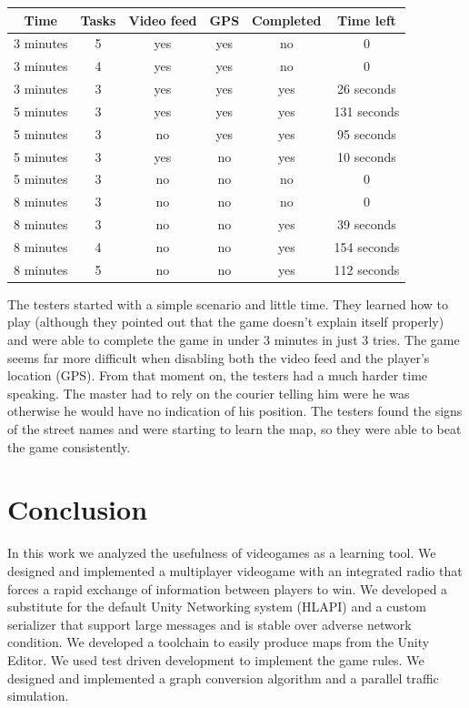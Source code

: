 \documentclass[12pt]{article}
\begin{document}
\begin{center}
\begin{tabular}{ |c|c|c|c||c|c| }
\hline
	Time & Tasks & Video feed & GPS & Completed & Time left \\
\hline
	3 minutes & 5 & yes & yes & no & 0 \\
	3 minutes & 4 & yes & yes & no & 0 \\
	3 minutes & 3 & yes & yes & yes & 26 seconds \\
	5 minutes & 3 & yes & yes & yes & 131 seconds \\
	5 minutes & 3 & no & yes & yes & 95 seconds \\
	5 minutes & 3 & yes & no & yes & 10 seconds \\
	5 minutes & 3 & no & no & no & 0 \\
	8 minutes & 3 & no & no & no & 0 \\
	8 minutes & 3 & no & no & yes & 39 seconds \\
	8 minutes & 4 & no & no & yes & 154 seconds \\
	8 minutes & 5 & no & no & yes & 112 seconds \\
\hline
\end{tabular}
\end{center}

The testers started with a simple scenario and little time. They learned how to play (although they pointed out that the game doesn't explain itself properly) and were able to complete the game in under 3 minutes in just 3 tries. The game seems far more difficult when disabling both the video feed and the player's location (GPS). From that moment on, the testers had a much harder time speaking. The master had to rely on the courier telling him were he was otherwise he would have no indication of his position. The testers found the signs of the street names and were starting to learn the map, so they were able to beat the game consistently.

\clearpage

\section{Conclusion}
In this work we analyzed the usefulness of videogames as a learning tool. We designed and implemented a multiplayer videogame with an integrated radio that forces a rapid exchange of information between players to win. We developed a substitute for the default Unity Networking system (HLAPI) and a custom serializer that support large messages and is stable over adverse network condition. We developed a toolchain to easily produce maps from the Unity Editor. We used test driven development to implement the game rules. We designed and implemented a graph conversion algorithm and a parallel traffic simulation. \\
\end{document}
